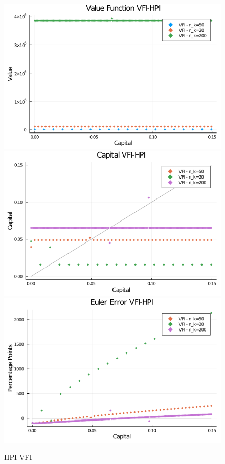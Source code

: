 \documentclass[]{article}
\begin{document}
\begin{figure}

{\centering \includegraphics[width=0.65\linewidth]{Assignment2/graphs/HPI_V} \includegraphics[width=0.65\linewidth]{Assignment2/graphs/HPI_Cap} \includegraphics[width=0.65\linewidth]{Assignment2/graphs/HPI_Euler} 

}

\caption{HPI-VFI}\label{fig:unnamed-chunk-3}
\end{figure}
\end{document}
